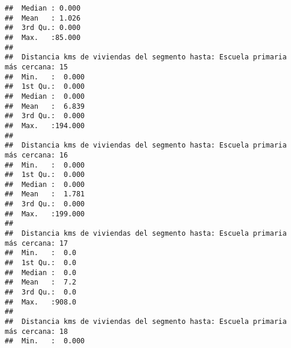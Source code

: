 \documentclass[11pt,]{article}
\begin{document}
\begin{verbatim}
##  Median : 0.000                                                                 
##  Mean   : 1.026                                                                 
##  3rd Qu.: 0.000                                                                 
##  Max.   :85.000                                                                 
##                                                                                 
##  Distancia kms de viviendas del segmento hasta: Escuela primaria más cercana: 15
##  Min.   :  0.000                                                                
##  1st Qu.:  0.000                                                                
##  Median :  0.000                                                                
##  Mean   :  6.839                                                                
##  3rd Qu.:  0.000                                                                
##  Max.   :194.000                                                                
##                                                                                 
##  Distancia kms de viviendas del segmento hasta: Escuela primaria más cercana: 16
##  Min.   :  0.000                                                                
##  1st Qu.:  0.000                                                                
##  Median :  0.000                                                                
##  Mean   :  1.781                                                                
##  3rd Qu.:  0.000                                                                
##  Max.   :199.000                                                                
##                                                                                 
##  Distancia kms de viviendas del segmento hasta: Escuela primaria más cercana: 17
##  Min.   :  0.0                                                                  
##  1st Qu.:  0.0                                                                  
##  Median :  0.0                                                                  
##  Mean   :  7.2                                                                  
##  3rd Qu.:  0.0                                                                  
##  Max.   :908.0                                                                  
##                                                                                 
##  Distancia kms de viviendas del segmento hasta: Escuela primaria más cercana: 18
##  Min.   :  0.000                                                                

\end{verbatim}
\end{document}

